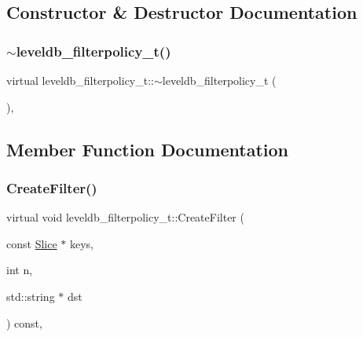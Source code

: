 \subsection{Constructor \& Destructor Documentation}
\mbox{\label{structleveldb__filterpolicy__t_afea40a87cf4123be464f22d021dec9f3}} 
\subsubsection{\texorpdfstring{$\sim$leveldb\_filterpolicy\_t()}{~leveldb\_filterpolicy\_t()}}
{\footnotesize\ttfamily virtual leveldb\+\_\+filterpolicy\+\_\+t\+::$\sim$leveldb\+\_\+filterpolicy\+\_\+t (\begin{DoxyParamCaption}{ }\end{DoxyParamCaption})\hspace{0.3cm}{\ttfamily [inline]}, {\ttfamily [virtual]}}



\subsection{Member Function Documentation}
\mbox{\label{structleveldb__filterpolicy__t_aa833af852917381cd8db4c8ec21a3762}} 
\subsubsection{\texorpdfstring{CreateFilter()}{CreateFilter()}}
{\footnotesize\ttfamily virtual void leveldb\+\_\+filterpolicy\+\_\+t\+::\+Create\+Filter (\begin{DoxyParamCaption}\item[{const \mbox{\hyperlink{classleveldb_1_1_slice}{Slice}} $\ast$}]{keys,  }\item[{int}]{n,  }\item[{std\+::string $\ast$}]{dst }\end{DoxyParamCaption}) const\hspace{0.3cm}{\ttfamily [inline]}, {\ttfamily [virtual]}}



